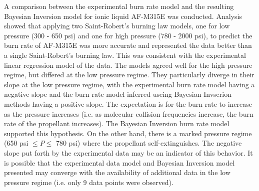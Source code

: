 \documentclass{article}
\begin{document}
A comparison between the experimental burn rate model and the resulting Bayesian Inversion model for ionic liquid
AF-M315E was conducted. Analysis showed that applying two Saint-Robert's burning law models, one for low pressure
(300 - 650 psi) and one for high pressure (780 - 2000 psi), to predict the burn rate of AF-M315E was more accurate
and represented the data better than a single Saint-Robert's burning law. This was consistent with the experimental
linear regression model of the data. The models agreed well for the high pressure regime, but differed at the low
pressure regime. They particularly diverge in their slope at the low pressure regime, with the experimental burn
rate model having a negative slope and the burn rate model inferred useing Bayesian Invserion methods having a positive
slope. The expectation is for the burn rate to increase as the pressure increases (i.e. as molecular collision frequencies
increase, the burn rate of the propellant increases). The Bayesian Inversion burn rate model supported this hypothesis.
On the other hand, there is a marked pressure regime (650 psi $\leq P \leq$ 780 psi) where the propellant self-extinguishes.
The negative slope put forth by the experimental data may be an indicator of this behavior. It is possible that the
experimental data model and Bayesian Inversion model presented may converge with the availability of additional data
in the low pressure regime (i.e. only 9 data points were observed).

\nocite{*}


\end{document}
